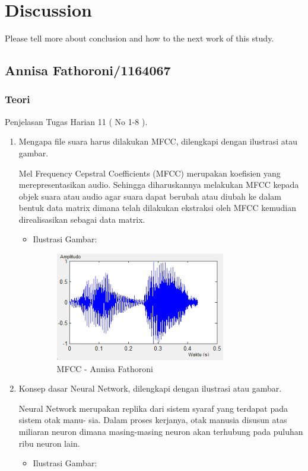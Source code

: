 \chapter{Discussion}
Please tell more about conclusion and how to the next work of this study.

\section{Annisa Fathoroni/1164067}
\subsection{Teori}
Penjelasan Tugas Harian 11 ( No 1-8 ).
\begin{enumerate}
\item Mengapa file suara harus dilakukan MFCC, dilengkapi dengan ilustrasi atau gambar.

Mel Frequency Cepstral Coefficients (MFCC) merupakan koefisien yang merepresentasikan audio. Sehingga diharuskannya melakukan MFCC kepada objek suara atau audio agar suara dapat berubah atau diubah ke dalam bentuk data matrix dimana telah dilakukan ekstraksi oleh MFCC kemudian direalisasikan sebagai data matrix.

\begin{itemize}
\item Ilustrasi Gambar:

\begin{figure}[!hbtp]
\centering
\includegraphics[scale=0.7]{figures/Chapter6AnnisaFathoroni1.png}
\caption{MFCC - Annisa Fathoroni}
\label{MFCC - Annisa Fathoroni}
\end{figure}

\end{itemize}

\item Konsep dasar Neural Network, dilengkapi dengan ilustrasi atau gambar.

Neural Network merupakan replika dari sistem syaraf yang terdapat pada sistem otak manu- sia. Dalam proses kerjanya, otak manusia disusun atas miliaran neuron dimana masing-masing neuron akan terhubung pada puluhan ribu neuron lain.
\begin{itemize}
\item Ilustrasi Gambar:


\end{itemize}
\end{enumerate}
